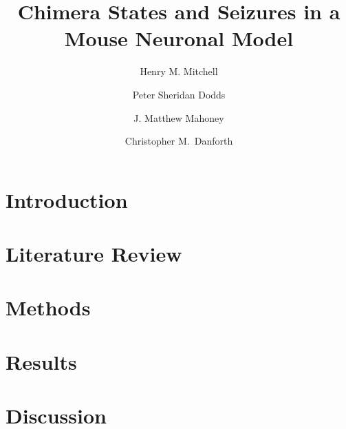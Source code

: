 \documentclass{ws-ijbc}
\begin{document}

\title{Chimera States and Seizures in a Mouse Neuronal Model}

\author{Henry M. Mitchell}
\address{Vermont Complex Systems Center, University of Vermont, \\
  82 University Place, Burlington, Vermont 05405, USA \\
  Henry.Mitchell@uvm.edu}
\author{Peter Sheridan Dodds}
\address{Vermont Complex Systems Center, University of Vermont, \\
  82 University Place, Burlington, Vermont 05405, USA}
\author{J. Matthew Mahoney}
\address{Department of Neurology, University of Vermont, \\
  95 Carrigan Drive, Burlington, Vermont 05405, USA}
\author{Christopher M.\ Danforth}
\address{Vermont Complex Systems Center, University of Vermont, \\
  82 University Place, Burlington, Vermont 05405, USA}

\maketitle

\begin{abstract}
  
\end{abstract}


\section{Introduction}
\label{sec:intro}


\section{Literature Review}
\label{sec:lit_review}


\section{Methods}
\label{sec:methods}


\section{Results}
\label{sec:results}


\section{Discussion}
\label{sec:conclusion}


\label{sec:acknowledgements}


\label{sec:figures}



\end{document}

